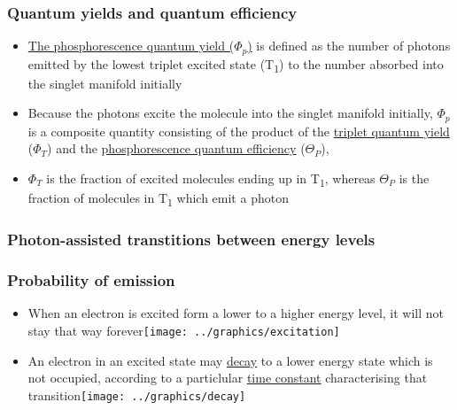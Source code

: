 \documentclass[a4paper,12pt,titlepage]{article}
\begin{document}
\begin{frame}
\frametitle{Quantum yields and quantum efficiency}
\begin{itemize}
\item \underline{The phosphorescence quantum yield (\(\Phi_p\))} is defined as the number of photons emitted by the lowest triplet excited state (T\textsubscript{1}) to the number absorbed into the singlet manifold initially\\
{\centering {}}
\item Because the photons excite the molecule into the singlet manifold initially, \(\Phi_p\) is a composite quantity consisting of the product of the \underline{triplet quantum yield} (\(\Phi_T\)) and the \underline{phosphorescence quantum efficiency} (\(\Theta_P\)), 
\item \(\Phi_T\) is the fraction of excited molecules ending up in T\textsubscript{1}, whereas \(\Theta_P\) is the fraction of molecules in T\textsubscript{1} which emit a photon
\end{itemize}
\end{frame}

\begin{frame}
\frametitle{Photon-assisted transtitions between energy levels}

\end{frame}

\begin{frame}
\frametitle{Probability of emission}
\begin{itemize}[<+->]
\item When an electron is excited form a lower to a higher energy level, it will not stay that way forever\newline \texttt{[image: ../graphics/excitation]} \medskip
\item An electron in an excited state may \underline{decay} to a lower energy state which is not occupied, according to a particlular \underline{time constant} characterising that transition\newline \texttt{[image: ../graphics/decay]}
\end{itemize}
\end{frame}
\end{document}
